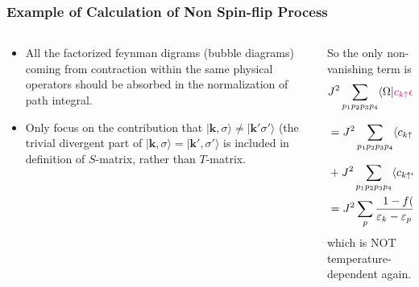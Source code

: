\documentclass[10pt,aspectratio=43,xcolor=x11names]{beamer}%
\begin{document}
		\begin{frame}\frametitle{Example of Calculation of Non Spin-flip Process}
			\begin{columns}
				\begin{column}{0.38\textwidth}
					\begin{itemize}
						\item All the factorized feynman digrams (bubble diagrams) coming from contraction within the same physical operators should be absorbed in the normalization of path integral.
						\item Only focus on the contribution that $|\bm{k},\sigma\rangle\neq|\bm{k'}\sigma'\rangle$ (the trivial divergent part of $|\bm{k},\sigma\rangle=|\bm{k'},\sigma'\rangle$ is included in definition of $S$-matrix, rather than $T$-matrix.
					\end{itemize}
				\end{column}
				\pause
				\begin{column}{0.7\textwidth}
					So the only non-vanishing term is
					\begin{align*}
						&J^2\sum_{p_1p_2p_3p_4}\langle\Omega|{\color{magenta}c_{k\uparrow}}{\color{red}c_{p_1\uparrow}^\dagger c_{p_2\uparrow}}S_d^z \hat{G}{\color{blue}c_{p_3\uparrow}^\dagger c_{p_4\uparrow}}S_d^z{\color{magenta}c_{k'\uparrow}^\dagger}|\Omega\rangle\\
						&=J^2\sum_{p_1p_2p_3p_4}\langle c_{k\uparrow} c_{p_1\uparrow}^\dagger\rangle S_d^z\dfrac{\langle c_{p_2\uparrow} c_{p_3\uparrow}^\dagger\rangle}{\varepsilon_k- \varepsilon_{p_2}+i\delta}S_d^z\langle c_{p_4\uparrow} c_{k'\uparrow}^\dagger\rangle\nonumber\\
						&+J^2\sum_{p_1p_2p_3p_4}\langle c_{k\uparrow} c_{p_3\uparrow}^\dagger\rangle S_d^z\dfrac{\langle c_{p_1\uparrow}^\dagger c_{p_4\uparrow}\rangle}{\varepsilon_k-\varepsilon_{p_4}+i\delta}S_d^z\langle c_{p_2\uparrow} c_{k'\uparrow}^\dagger\rangle\nonumber\\
						&=J^2\sum_p\dfrac{1-f(\varepsilon_p)}{\varepsilon_k- \varepsilon_p+i\delta}S_d^z+J^2\sum_p\dfrac{f(\varepsilon_p)}{\varepsilon_k- \varepsilon_p+i\delta}S_d^z,
					\end{align*}
					which is NOT temperature-dependent again.
				\end{column}
			\end{columns}
		\end{frame}
\end{document}
